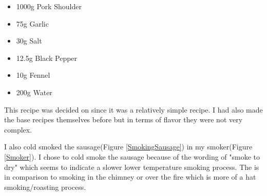 \documentclass[letterpaper,11pt,leqno]{article}
\begin{document}
\begin{itemize}
	\item 1000g Pork Shoulder
	\item 75g Garlic
	\item 30g Salt
	\item 12.5g Black Pepper
	\item 10g Fennel
	\item 200g Water
\end{itemize}


This recipe was decided on since it was a relatively simple recipe. I had also made the base recipes themselves before but in terms of flavor they were not very complex.

I also cold smoked the sausage(Figure \ref{SmokingSausage}) in my smoker(Figure \ref{Smoker}). I chose to cold smoke the sausage because of the wording of "smoke to dry" which seems to indicate a slower lower temperature smoking process. The is in comparison to smoking in the chimney or over the fire which is more of a hat smoking/roasting process.
\end{document}
